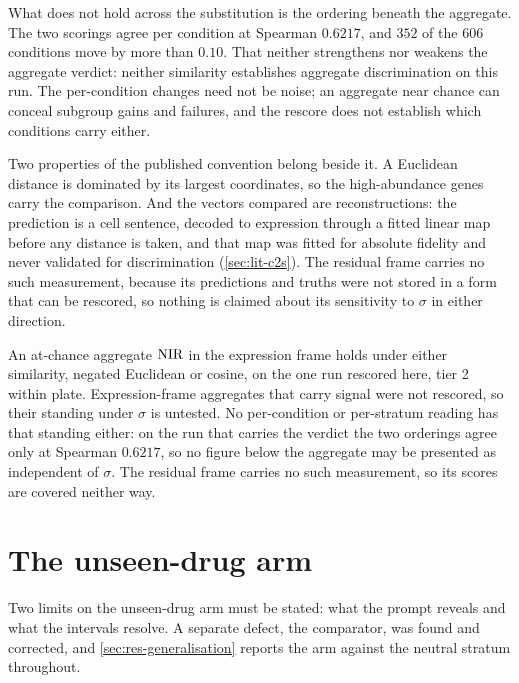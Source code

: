 What does not hold across the substitution is the ordering beneath the
aggregate. The two scorings agree per condition at Spearman $0.6217$, and $352$
of the $606$ conditions move by more than $0.10$. That neither strengthens nor
weakens the aggregate verdict: neither similarity establishes aggregate
discrimination on this run. The per-condition changes need not be noise;
an aggregate near chance can conceal subgroup gains and failures, and the
rescore does not establish which conditions carry either.

Two properties of the published convention belong beside it. A Euclidean
distance is dominated by its largest coordinates, so the high-abundance genes
carry the comparison. And the vectors compared are reconstructions: the
prediction is a cell sentence, decoded to expression through a fitted linear map
before any distance is taken, and that map was fitted for absolute fidelity and
never validated for discrimination (\cref{sec:lit-c2s}). The residual frame
carries no such measurement, because its predictions and truths were not stored
in a form that can be rescored, so nothing is claimed about its sensitivity to
$\sigma$ in either direction.

\begin{scopelimit}
An at-chance aggregate $\textrm{NIR}$ in the expression frame holds under either
similarity, negated Euclidean or cosine, on the one run rescored here, tier 2
within plate. Expression-frame aggregates that carry signal were not rescored,
so their standing under $\sigma$ is untested. No per-condition or per-stratum
reading has that standing either: on the run that carries the verdict the two
orderings agree only at Spearman $0.6217$, so no figure below the aggregate may
be presented as independent of $\sigma$. The residual frame carries no such
measurement, so its scores are covered neither way.
\end{scopelimit}

\section{The unseen-drug arm}
\label{sec:lim-unseen}

Two limits on the unseen-drug arm must be stated: what the prompt reveals and
what the intervals resolve. A separate defect, the comparator, was found and
corrected, and \cref{sec:res-generalisation} reports the arm against the neutral
stratum throughout.

